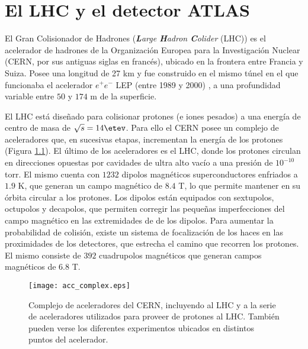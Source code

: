 \chapter{El LHC y el detector ATLAS}



El Gran Colisionador de Hadrones (\textit{\textbf{L}arge \textbf{H}adron \textbf{C}olider} (LHC)) \cite{Evans:1129806} es el acelerador de hadrones de la Organización Europea para la Investigación Nuclear (CERN, por sus antiguas siglas en francés), ubicado en la frontera entre Francia y Suiza. Posee una longitud de 27 km y fue construido en el mismo túnel en el que funcionaba el acelerador $e^{+}e^{-}$ LEP (entre 1989 y 2000) \cite{LEPbook}, a una profundidad variable entre $50$ y $174$ m de la superficie.

El LHC está diseñado para colisionar protones (e iones pesados) a una energía de centro de masa de $\sqrt{s}=14 \etev$. Para ello el CERN posee un complejo de aceleradores que, en sucesivas etapas, incrementan la energía de los protones (Figura \ref{acc_complex}). El último de los aceleradores es el LHC, donde los protones circulan en direcciones opuestas por cavidades de ultra alto vacío a una presión de $10^{-10}$ torr. El mismo cuenta con $1232$ dipolos magnéticos superconductores enfriados a $1.9$ K, que generan un campo magnético de $8.4$ T, lo que permite mantener en su órbita circular a los protones. Los dipolos están equipados con sextupolos, octupolos y decapolos, que permiten corregir las pequeñas imperfecciones del campo magnético en las extremidades de de los dipolos. Para aumentar la probabilidad de colisión, existe un sistema de focalización de los haces en las proximidades de los detectores, que estrecha el camino que recorren los protones. El mismo consiste de $392$ cuadrupolos magnéticos que generan campos magnéticos de $6.8$ T. 

\begin{figure}[ht]
\centering
\texttt{[image: acc\_complex.eps]}
\caption{Complejo de aceleradores del CERN, incluyendo al LHC y a la serie de aceleradores utilizados para proveer de protones al LHC. También pueden verse los diferentes experimentos ubicados en distintos puntos del acelerador.}
\label{acc_complex}
\end{figure}

